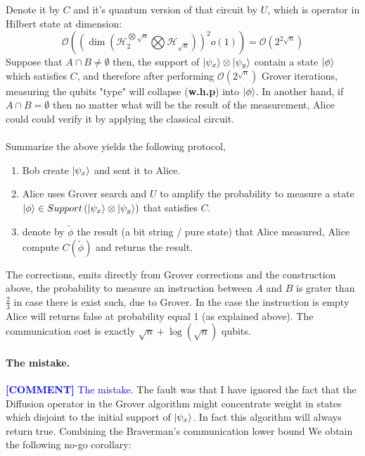 \documentclass{article}
\newcommand{\commentt}[1]{\textcolor{blue}{ \textbf{[COMMENT]} #1}}
\newcommand{\ctt}[1]{\commentt{#1}}
\newcommand{\onotation}[1]{\(\mathcal{O} \left( {#1}  \right) \)}
\newcommand{\ona}[1]{\onotation{#1}}
\begin{document}
\begin{multicols*}{2}
Denote it by \( C \) and it's quantum version of that circuit by \( U \), which is operator in Hilbert state at dimension: \[ \mathcal{O} \left( \left( \dim \left( \mathcal{H}_{2}^{\bigotimes \sqrt{n}} \bigotimes \mathcal{H}_{\sqrt{n}} \right) \right) ^2 o(1) \right) = \mathcal{O} \left( 2^{2\sqrt{n}}  \right)  \]
Suppose that \( A \cap B \neq \emptyset \) then, the support of \( \ket{\psi_x} \otimes \ket{\psi_y} \) contain a state \( \ket{\phi} \) which satisfies \(C\), and therefore  after performing \ona{ 2^{ \sqrt{n}}} Grover iterations, measuring the qubits "type" will collapse (\textbf{w.h.p}) into \( \ket{\phi} \). In another hand, if \( A \cap B = \emptyset \) then no matter what will be the result of the measurement, Alice could could verify it by applying the classical circuit. 
\paragraph{}Summarize the above yields the following protocol,
\begin{enumerate}
    \item Bob create \( \ket{\psi_x} \) and sent it to Alice.
    \item Alice uses Grover search and \(U\) to amplify the probability to measure a state \( \ket{\phi} \in Support \left(   \ket{\psi_x} \otimes \ket{\psi_y}  \right) \) that satisfies \(C\).
    \item denote by \( \tilde{\phi} \) the result (a bit string / pure state) that Alice measured, Alice compute \(C\left(\tilde{\phi}\right) \) and returns the result. 
\end{enumerate}
The corrections, emits directly from Grover corrections and the construction above, the probability to measure an instruction between \(A\) and \(B\) is grater than \( \frac{2}{3} \) in case there is exist such, due to Grover. In the case the instruction is empty Alice will returns false at probability equal 1 (as explained above). The communication cost is exactly  \( \sqrt{n} + \log(\sqrt{n}) \) qubits. 


\paragraph{ The mistake.} \ctt{The mistake.} The fault was that I have ignored the fact that the Diffusion operator in the Grover algorithm might concentrate weight in states which disjoint to the initial support of \( \ket{\psi_{x}}\). In fact this algorithm will always return true. 
Combining the Braverman's communication  lower bound We obtain the following no-go corollary:  %
\end{multicols*}
\end{document}
